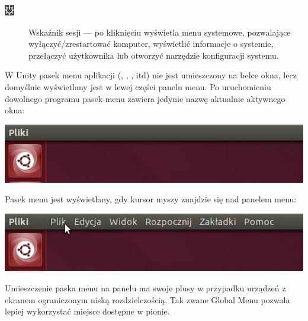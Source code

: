\begin{description}
\item[\includegraphics{images/unity_wskaznik_system.png}]\textcolor{ubuntu_orange}{Wskaźnik sesji} --- po kliknięciu wyświetla menu systemowe, pozwalające wyłączyć/zrestartować komputer, wyświetlić informacje o systemie, przełączyć użytkownika lub otworzyć narzędzie konfiguracji systemu.
\end{description}

\label{unity_menu_bar}
W Unity pasek menu aplikacji (, , , itd) nie jest umieszczony na belce okna, lecz domyślnie wyświetlany jest w lewej części panelu menu. Po uruchomieniu dowolnego programu pasek menu zawiera jedynie nazwę aktualnie aktywnego okna:

\begin{center}
	\includegraphics[width=\linewidth]{images/unity_menu_bar2.png}
\end{center}

Pasek menu jest wyświetlany, gdy kursor myszy znajdzie się nad panelem menu:

\begin{center}
	\includegraphics[width=\linewidth]{images/unity_menu_bar3.png}
\end{center}

Umieszczenie paska menu na panelu ma swoje plusy w przypadku urządzeń z ekranem ograniczonym niską rozdzielczością. Tak zwane \textcolor{ubuntu_orange}{Global Menu} pozwala lepiej wykorzystać miejsce dostępne w pionie.
